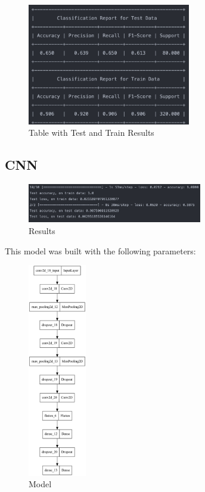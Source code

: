\documentclass[conference]{IEEEtran}
\begin{document}
\begin{figure}[!h!]
    \includegraphics[width=2.8in]{DT/Screenshot 2023-01-21 at 01.15.42.png}%
    \caption{Table with Test and Train Results}%
    \label{fig:conf_gnb_r_3}%
\end{figure}

\subsection{CNN}

\begin{figure}
    \centering
    \includegraphics[width=3in]{cnn/Screenshot 2023-01-21 at 02.04.01.png}
    \caption{Results}
    \label{fig:my_label}
\end{figure}

This model was built with the following parameters:
\begin{figure}
    \centering
    \includegraphics[width=1in]{cnn/2.png}
    \caption{Model}
    \label{fig:my_label}
\end{figure}
\end{document}

